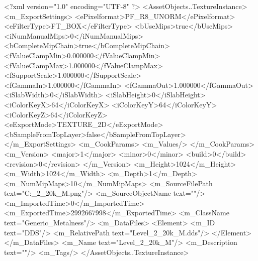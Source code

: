 <?xml version="1.0" encoding="UTF-8" ?>
<AssetObjects..TextureInstance>
	<m_ExportSettings>
		<ePixelformat>PF_R8_UNORM</ePixelformat>
		<eFilterType>FT_BOX</eFilterType>
		<bUseMips>true</bUseMips>
		<iNumManualMips>0</iNumManualMips>
		<bCompleteMipChain>true</bCompleteMipChain>
		<fValueClampMin>0.000000</fValueClampMin>
		<fValueClampMax>1.000000</fValueClampMax>
		<fSupportScale>1.000000</fSupportScale>
		<fGammaIn>1.000000</fGammaIn>
		<fGammaOut>1.000000</fGammaOut>
		<iSlabWidth>0</iSlabWidth>
		<iSlabHeight>0</iSlabHeight>
		<iColorKeyX>64</iColorKeyX>
		<iColorKeyY>64</iColorKeyY>
		<iColorKeyZ>64</iColorKeyZ>
		<eExportMode>TEXTURE_2D</eExportMode>
		<bSampleFromTopLayer>false</bSampleFromTopLayer>
	</m_ExportSettings>
	<m_CookParams>
		<m_Values/>
	</m_CookParams>
	<m_Version>
		<major>1</major>
		<minor>0</minor>
		<build>0</build>
		<revision>0</revision>
	</m_Version>
	<m_Height>1024</m_Height>
	<m_Width>1024</m_Width>
	<m_Depth>1</m_Depth>
	<m_NumMipMaps>10</m_NumMipMaps>
	<m_SourceFilePath text="C:\Users\Shadow\Desktop\Prototypes\Level_2_20k_M.png"/>
	<m_SourceObjectName text=""/>
	<m_ImportedTime>0</m_ImportedTime>
	<m_ExportedTime>2992667998</m_ExportedTime>
	<m_ClassName text="Generic_Metalness"/>
	<m_DataFiles>
		<Element>
			<m_ID text="DDS"/>
			<m_RelativePath text="Level_2_20k_M.dds"/>
		</Element>
	</m_DataFiles>
	<m_Name text="Level_2_20k_M"/>
	<m_Description text=""/>
	<m_Tags/>
</AssetObjects..TextureInstance>

